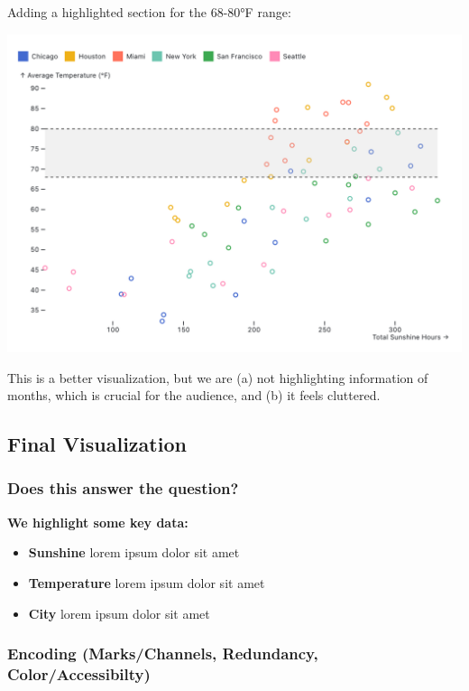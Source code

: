 \documentclass{article}
\begin{document}
\pagebreak

Adding a highlighted section for the 68-80°F range:

\begin{center}
    \includegraphics[scale=0.2]{scatter2.png}
\end{center}

This is a better visualization, but we are (a) not highlighting information of months, which is crucial for the audience, and (b) it feels cluttered.

\subsection{Final Visualization}
\subsubsection{Does this answer the question?}

\textbf{We highlight some key data:}
\begin{itemize}
    \item \textbf{Sunshine} lorem ipsum dolor sit amet  
    \item \textbf{Temperature} lorem ipsum dolor sit amet
    \item \textbf{City} lorem ipsum dolor sit amet
\end{itemize}

\subsubsection{Encoding (Marks/Channels, Redundancy, Color/Accessibilty)}
\end{document}
